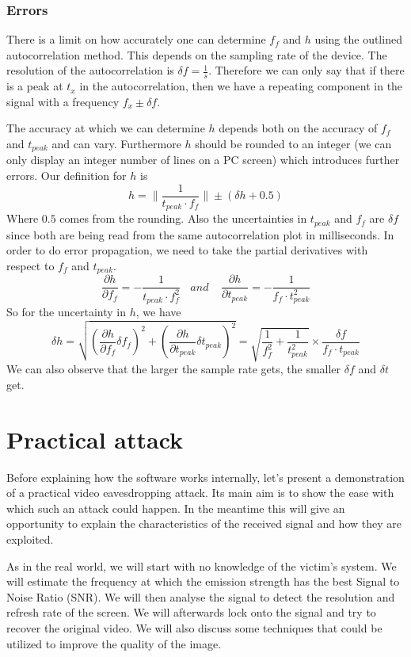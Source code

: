 \documentclass[a4paper,12pt,twoside,openright]{report}
\begin{document}
\subsection{Errors}

There is a limit on how accurately one can determine $f_{f}$ and $h$ using the outlined autocorrelation method. This depends on the sampling rate of the device. The resolution of the autocorrelation is $\delta f = \frac{1}{s}$. Therefore we can only say that if there is a peak at $t_{x}$ in the autocorrelation, then we have a repeating component in the signal with a frequency $f_{x} \pm \delta f$.

The accuracy at which we can determine $h$ depends both on the accuracy of $f_{f}$ and $t_{peak}$ and can vary. Furthermore $h$ should be rounded to an integer (we can only display an integer number of lines on a PC screen) which introduces further errors. Our definition for $h$ is
$$h = \| \frac{1}{t_{peak} \cdot f_{f}} \| \pm (\delta h + 0.5)$$
Where $0.5$ comes from the rounding. Also the uncertainties in $t_{peak}$ and $f_{f}$ are $\delta f$ since both are being read from the same autocorrelation plot in milliseconds. In order to do error propagation, we need to take the partial derivatives with respect to $f_{f}$ and $t_{peak}$.
$$\frac{\partial h}{\partial f_{f}} = - \frac{1}{t_{peak} \cdot f_{f}^2}
 \,\,\,\,\ and \,\,\,\,\ \
\frac{\partial h}{\partial t_{peak}} = - \frac{1}{f_{f} \cdot t_{peak}^2}$$
So for the uncertainty in $h$, we have
$$\delta h =
\sqrt{\left( \frac{\partial h}{\partial f_{f}} \delta f_{f} \right)^2 + \left( \frac{\partial h}{\partial t_{peak}} \delta t_{peak} \right)^2} = 
\sqrt{\frac{1}{f_{f}^2} + \frac{1}{t_{peak}^2}} \times \frac{\delta f}{f_{f} \cdot t_{peak}}$$
We can also observe that the larger the sample rate gets, the smaller $\delta f$ and $\delta t$ get.

\chapter{Practical attack} 

Before explaining how the software works internally, let's present a demonstration of a practical video eavesdropping attack. Its main aim is to show the ease with which such an attack could happen. In the meantime this will give an opportunity to explain the characteristics of the received signal and how they are exploited.

As in the real world, we will start with no knowledge of the victim's system. We will estimate the frequency at which the emission strength has the best Signal to Noise Ratio (SNR). We will then analyse the signal to detect the resolution and refresh rate of the screen. We will afterwards lock onto the signal and try to recover the original video. We will also discuss some techniques that could be utilized to improve the quality of the image.
\end{document}
